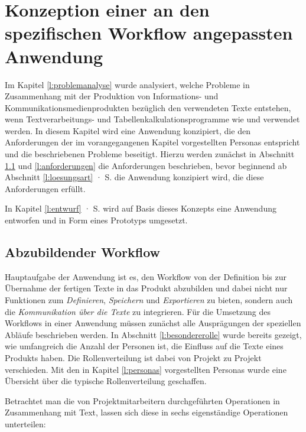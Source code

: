 \section{Konzeption einer an den spezifischen Workflow angepassten Anwendung}\label{l:konzeption}

Im Kapitel \ref{l:problemanalyse} wurde analysiert, welche Probleme in Zusammenhang mit der Produktion von Informations- und Kommunikationsmedienprodukten bezüglich den verwendeten Texte entstehen, wenn Textverarbeitungs- und Tabellenkalkulationsprogramme wie  und  verwendet werden. In diesem Kapitel wird eine Anwendung konzipiert, die den Anforderungen der im vorangegangenen Kapitel vorgestellten Personas entspricht und die beschriebenen Probleme beseitigt. Hierzu werden zunächst in Abschnitt \ref{l:workflow} und \ref{l:anforderungen} die Anforderungen beschrieben, bevor beginnend ab Abschnitt \ref{l:loesungsart} · S.\pageref{l:loesungsart} die Anwendung konzipiert wird, die diese Anforderungen erfüllt. 

\bigskip

In Kapitel \ref{l:entwurf} · S.\pageref{l:entwurf} wird auf Basis dieses Konzepts eine Anwendung entworfen und in Form eines Prototyps umgesetzt.

\pagebreak

\subsection{Abzubildender Workflow}\label{l:workflow}

Hauptaufgabe der Anwendung ist es, den Workflow von der Definition bis zur Übernahme der fertigen Texte in das Produkt abzubilden und dabei nicht nur Funktionen zum \emph{Definieren}, \emph{Speichern} und \emph{Exportieren} zu bieten, sondern auch die \emph{Kommunikation über die Texte} zu integrieren. Für die Umsetzung des Workflows in einer Anwendung müssen zunächst alle Ausprägungen der speziellen Abläufe beschrieben werden. In Abschnitt \ref{l:besondererolle} wurde bereits gezeigt, wie umfangreich die Anzahl der Personen ist, die Einfluss auf die Texte eines Produkts haben. Die Rollenverteilung ist dabei von Projekt zu Projekt verschieden. Mit den in Kapitel \ref{l:personas} vorgestellten Personas wurde eine Übersicht über die typische Rollenverteilung geschaffen. 

\bigskip

Betrachtet man die von Projektmitarbeitern durchgeführten Operationen in Zusammenhang mit Text, lassen sich diese in sechs eigenständige Operationen unterteilen:

